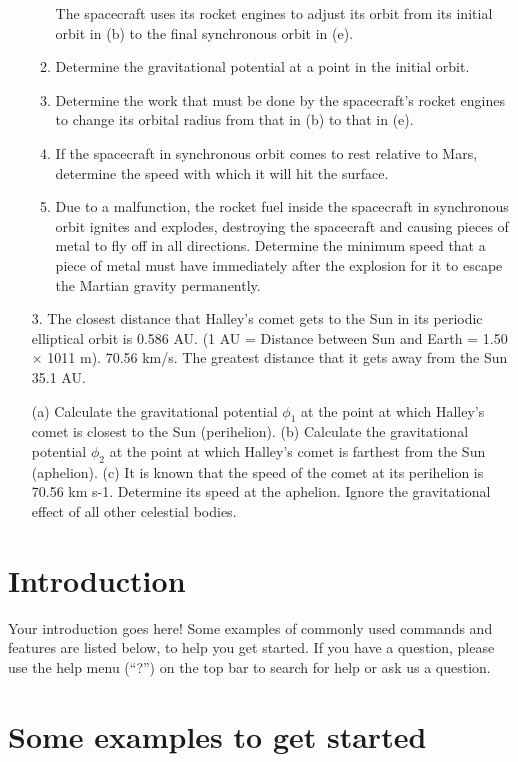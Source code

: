 \documentclass[a4paper,12pt]{article}
\begin{document}
\begin{enumerate}
\begin{enumerate}
The spacecraft uses its rocket engines to adjust its orbit from its initial orbit in (b) to the final synchronous orbit in (e).\\ 

\item Determine the gravitational potential at a point in the initial orbit. 
\item Determine the work that must be done by the spacecraft’s rocket engines to change its orbital radius from that in (b) to that in (e).
\item If the spacecraft in synchronous orbit comes to rest relative to Mars, determine the speed with which it will hit the surface. 
\item Due to a malfunction, the rocket fuel inside the spacecraft in synchronous orbit ignites and explodes, destroying the spacecraft and causing pieces of metal to fly off in all directions. Determine the minimum speed that a piece of metal must have immediately after the explosion for it to escape the Martian gravity permanently.
\end{enumerate}



\vspace{1cm}
3. The closest distance that Halley’s comet gets to the Sun in its periodic elliptical orbit is 0.586 AU. (1 AU = Distance between Sun and Earth = 1.50 × 1011 m). 70.56 km/s.
The greatest distance that it gets away from the Sun 35.1 AU.

(a)	Calculate the gravitational potential $\phi_1$  at the point at which Halley’s comet is closest to the Sun (perihelion).
(b)	Calculate the gravitational potential $\phi_2$ at the point at which Halley’s comet is farthest from the Sun (aphelion).
(c)	It is known that the speed of the comet at its perihelion is 70.56 km s-1. Determine its speed at the aphelion. Ignore the gravitational effect of all other celestial bodies. 
\end{enumerate}


\section{Introduction}

Your introduction goes here! Some examples of commonly used commands and features are listed below, to help you get started. If you have a question, please use the help menu (``?'') on the top bar to search for help or ask us a question. 

\section{Some examples to get started}
\end{document}
